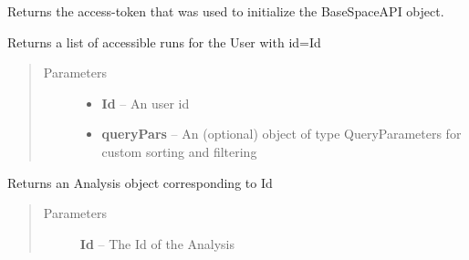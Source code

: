 \documentclass[letterpaper,10pt,english]{sphinxmanual}
\begin{document}
\begin{fulllineitems}
\begin{fulllineitems}
\end{fulllineitems}


\begin{fulllineitems}
\label{Available modules:BaseSpacePy.api.BaseSpaceAPI.BaseSpaceAPI.getAccessToken}
Returns the access-token that was used to initialize the BaseSpaceAPI object.

\end{fulllineitems}


\begin{fulllineitems}
\label{Available modules:BaseSpacePy.api.BaseSpaceAPI.BaseSpaceAPI.getAccessibleRunsByUser}
Returns a list of accessible runs for the User with id=Id
\begin{quote}\begin{description}
\item[{Parameters}] \leavevmode\begin{itemize}
\item {} 
\textbf{Id} -- An user id

\item {} 
\textbf{queryPars} -- An (optional) object of type QueryParameters for custom sorting and filtering

\end{itemize}

\end{description}\end{quote}

\end{fulllineitems}


\begin{fulllineitems}
\label{Available modules:BaseSpacePy.api.BaseSpaceAPI.BaseSpaceAPI.getAppResultById}
Returns an Analysis object corresponding to Id
\begin{quote}\begin{description}
\item[{Parameters}] \leavevmode
\textbf{Id} -- The Id of the Analysis


\end{description}
\end{quote}
\end{fulllineitems}
\end{fulllineitems}
\end{document}
